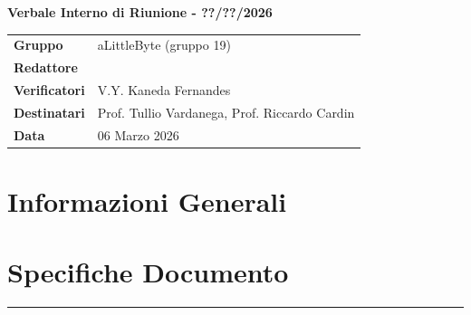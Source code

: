 \documentclass[a4paper,12pt]{article}
\begin{document}
\thispagestyle{firstpage}

\vspace*{0.5cm}

\begin{center}
    {\LARGE \textbf{Verbale Interno di Riunione - ??/??/2026}}
\end{center}

\vspace{1.5cm}

\begin{center}
    \renewcommand{\arraystretch}{1.3}
    \begin{tcolorbox}[
        width=0.92\textwidth,
        colback=gray!6,
        colframe=gray!45,
        boxrule=0.5pt,
        arc=2mm,
        boxsep=0pt,
        left=8pt, right=8pt, top=8pt, bottom=8pt
    ]
        \begin{tabularx}{\linewidth}{>{\bfseries}p{3.5cm} X}
            Gruppo      & aLittleByte (gruppo 19) \\
            Redattore   &  \\
            Verificatori& V.Y. Kaneda Fernandes\\
            Destinatari & Prof. Tullio Vardanega, Prof. Riccardo Cardin \\
            Data        & 06 Marzo 2026\\
        \end{tabularx}
    \end{tcolorbox}
\end{center}

\newpage

\tableofcontents
\newpage
\section{Informazioni Generali}
\section*{Specifiche Documento}
\hrule
\vspace{1cm}
\end{document}
